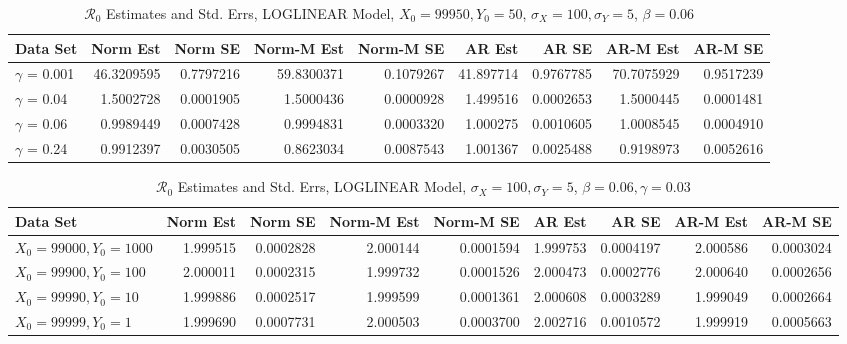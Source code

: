 \documentclass[12pt]{article}
\newcommand{\rr}{\ensuremath{\mathcal{R}_0}}
\begin{document}
\begin{table}[H]
	
	\caption{\label{tab:}$\rr$ Estimates and Std. Errs, LOGLINEAR Model,
		$X_0 = 99950, Y_0 = 50$, $\sigma_X = 100, \sigma_Y = 5$, $\beta = 0.06$}
	\centering
	\begin{footnotesize}
		\begin{tabular}[t]{l|r|r|r|r|r|r|r|r}
			\hline
			Data Set & Norm Est & Norm SE & Norm-M Est & Norm-M SE & AR Est & AR SE & AR-M Est & AR-M SE\\
			\hline
			$\gamma$ = 0.001 & 46.3209595 & 0.7797216 & 59.8300371 & 0.1079267 & 41.897714 & 0.9767785 & 70.7075929 & 0.9517239\\
			\hline
			$\gamma$ = 0.04 & 1.5002728 & 0.0001905 & 1.5000436 & 0.0000928 & 1.499516 & 0.0002653 & 1.5000445 & 0.0001481\\
			\hline
			$\gamma$ = 0.06 & 0.9989449 & 0.0007428 & 0.9994831 & 0.0003320 & 1.000275 & 0.0010605 & 1.0008545 & 0.0004910\\
			\hline
			$\gamma$ = 0.24 & 0.9912397 & 0.0030505 & 0.8623034 & 0.0087543 & 1.001367 & 0.0025488 & 0.9198973 & 0.0052616\\
			\hline
		\end{tabular}
	\end{footnotesize}
\end{table}

\begin{table}[H]
	
	\caption{\label{tab:}$\rr$ Estimates and Std. Errs, LOGLINEAR Model,
		$\sigma_X = 100, \sigma_Y = 5$, $\beta = 0.06, \gamma = 0.03$}
	\centering
	\begin{footnotesize}
		\begin{tabular}[t]{l|r|r|r|r|r|r|r|r}
			\hline
			Data Set & Norm Est & Norm SE & Norm-M Est & Norm-M SE & AR Est & AR SE & AR-M Est & AR-M SE\\
			\hline
			$X_0 = 99000, Y_0 = 1000$ & 1.999515 & 0.0002828 & 2.000144 & 0.0001594 & 1.999753 & 0.0004197 & 2.000586 & 0.0003024\\
			\hline
			$X_0 = 99900, Y_0 = 100$ & 2.000011 & 0.0002315 & 1.999732 & 0.0001526 & 2.000473 & 0.0002776 & 2.000640 & 0.0002656\\
			\hline
			$X_0 = 99990, Y_0 = 10$ & 1.999886 & 0.0002517 & 1.999599 & 0.0001361 & 2.000608 & 0.0003289 & 1.999049 & 0.0002664\\
			\hline
			$X_0 = 99999, Y_0 = 1$ & 1.999690 & 0.0007731 & 2.000503 & 0.0003700 & 2.002716 & 0.0010572 & 1.999919 & 0.0005663\\
			\hline
		\end{tabular}
	\end{footnotesize}
\end{table}
\end{document}
